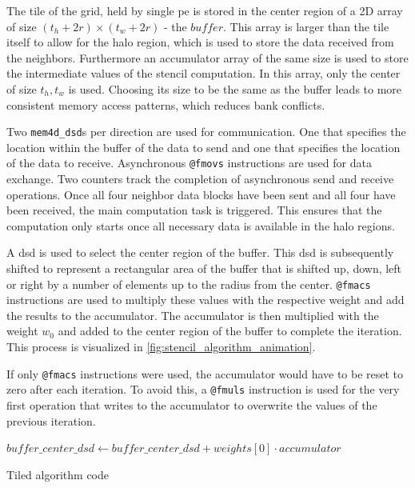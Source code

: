 The tile of the grid, held by single \ac{pe} is stored in the center region of a 2D array of size $(t_h+2r)\times (t_w+2r)$ - the $buffer$. This array is larger than the tile itself to allow for the halo region, which is used to store the data received from the neighbors. Furthermore an accumulator array of the same size is used to store the intermediate values of the stencil computation. In this array, only the center of size $t_h, t_w$ is used. Choosing its size to be the same as the buffer leads to more consistent memory access patterns, which reduces bank conflicts.

Two \texttt{mem4d\_dsd}s per direction are used for communication. One that specifies the location within the buffer of the data to send and one that specifies the location of the data to receive.
Asynchronous \texttt{@fmovs} instructions are used for data exchange. Two counters track the completion of asynchronous send and receive operations. Once all four neighbor data blocks have been sent and all four have been received, the main computation task is triggered. This ensures that the computation only starts once all necessary data is available in the halo regions.

A \ac{dsd} is used to select the center region of the buffer. This \ac{dsd} is subsequently shifted to represent a rectangular area of the buffer that is shifted up, down, left or right by a number of elements up to the radius from the center. \texttt{@fmacs} instructions are used to multiply these values with the respective weight and add the results to the accumulator. The accumulator is then multiplied with the weight $w_0$ and added to the center region of the buffer to complete the iteration. This process is visualized in \autoref{fig:stencil_algorithm_animation}.

If only \texttt{@fmacs} instructions were used, the accumulator would have to be reset to zero after each iteration. To avoid this, a \texttt{@fmuls} instruction is used for the very first operation that writes to the accumulator to overwrite the values of the previous iteration.

\begin{algorithm}[tbh]
    \SetAlgoLined
    $buffer\_center\_dsd \gets buffer\_center\_dsd + weights[0] \cdot accumulator$\;
    \caption{Tiled algorithm code}\label{alg:tiled_algorithm}
\end{algorithm}

